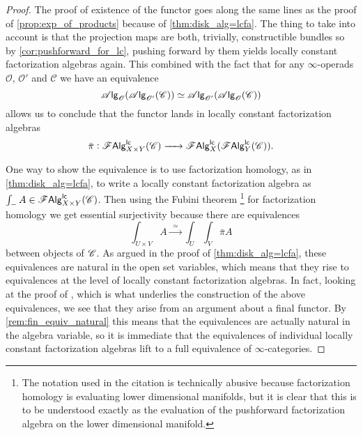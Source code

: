 \documentclass[../text]{subfiles}
\begin{document}
\begin{proof}
    The proof of existence of the functor goes along the same lines as the proof of \cref{prop:exp_of_products} because of \cref{thm:disk_alg=lcfa}. The thing to take into account is that the projection maps are both, trivially, constructible bundles so by \cref{cor:pushforward_for_lc}, pushing forward by them yields locally constant factorization algebras again. This combined with the fact that for any $\infty$-operads $\mathscr{O}$, $\mathscr{O}'$ and $\mathscr{C}$ we have an equivalence
    \begin{equation}
        \mathscr{A} \mathsf{lg}_{\mathscr{O}} (\mathscr{A} \mathsf{lg}_{\mathscr{O}'} (\mathscr{C})) \simeq \mathscr{A} \mathsf{lg}_{\mathscr{O}'} (\mathscr{A} \mathsf{lg}_{\mathscr{O}} (\mathscr{C}))
    \end{equation}
    allows us to conclude that the functor lands in locally constant factorization algebras
    \begin{equation}
        \bar{\pi}: \mathscr{F} \mathsf{Alg}^{\mathsf{lc}}_{X \times Y}(\mathscr{C}) \xrightarrow{\ \ \ \ } \mathscr{F} \mathsf{Alg}^{\mathsf{lc}}_{X}(\mathscr{F} \mathsf{Alg}^{\mathsf{lc}}_{Y}(\mathscr{C})).
    \end{equation}

    One way to show the equivalence is to use factorization homology, as in \cref{thm:disk_alg=lcfa}, to write a locally constant factorization algebra as $\int_{-} A \in \mathscr{F} \mathsf{Alg}^{\mathsf{lc}}_{X \times Y} (\mathscr{C})$. Then using the Fubini theorem \cite[cor.2.29]{aft_fhstrat}\footnote{The notation used in the citation is technically abusive because factorization homology is evaluating lower dimensional manifolds, but it is clear that this is to be understood exactly as the evaluation of the pushforward factorization algebra on the lower dimensional manifold.} for factorization homology we get essential surjectivity because there are equivalences
    \begin{equation}
        \int_{U \times V} A \xrightarrow{\ \ \simeq \ \ } \int_U \int_V \bar{\pi} A
    \end{equation}
    between objects of $\mathscr{C}$. As argued in the proof of \cref{thm:disk_alg=lcfa}, these equivalences are natural in the open set variables, which means that they rise to equivalences at the level of locally constant factorization algebras. In fact, looking at the proof of \cite[thm.2.25]{aft_fhstrat}, which is what underlies the construction of the above equivalences, we see that they arise from an argument about a final functor. By \cref{rem:fin_equiv_natural} this means that the equivalences are actually natural in the algebra variable, so it is immediate that the equivalences of individual locally constant factorization algebras lift to a full equivalence of $\infty$-categories.
\end{proof}
\end{document}
